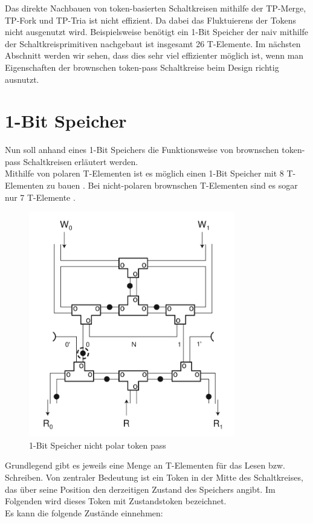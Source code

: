 \documentclass[11pt,a4paper]{article}
\begin{document}
%
Das direkte Nachbauen von token-basierten Schaltkreisen mithilfe
der TP-Merge, TP-Fork und TP-Tria ist nicht effizient.
%
Da dabei das Fluktuierens der Tokens nicht ausgenutzt wird.
%
Beispielsweise benötigt ein 1-Bit Speicher der naiv mithilfe der 
Schaltkreisprimitiven nachgebaut ist insgesamt 26 T-Elemente.
%
Im nächsten Abschnitt werden wir sehen, dass dies sehr viel effizienter möglich
ist, wenn man Eigenschaften der brownschen token-pass Schaltkreise
beim Design richtig ausnutzt.



\section{1-Bit Speicher}
Nun soll anhand eines 1-Bit Speichers die Funktionsweise von brownschen 
token-pass Schaltkreisen erläutert werden.
%
\\ Mithilfe von polaren T-Elementen ist es möglich einen 1-Bit Speicher mit 8
T-Elementen zu bauen \cite{Peper_Fundamentals_2013}. 
%
Bei nicht-polaren brownschen T-Elementen sind es sogar
nur 7  T-Elemente \cite{Peper_nonPolar_2018}.

\begin{figure}[h]
      \centering
      \includegraphics[width=9cm]{bilder/NonPolarMemory.png} 
      \caption{1-Bit Speicher nicht polar token pass}
\end{figure}

Grundlegend gibt es jeweils eine Menge an T-Elementen für das Lesen bzw. 
Schreiben.
%
Von zentraler Bedeutung ist ein Token in der Mitte des Schaltkreises,
das über seine Position den derzeitigen Zustand des Speichers angibt.
%
Im Folgenden wird dieses Token mit Zustandstoken bezeichnet. \\
%
Es kann die folgende Zustände einnehmen:
\end{document}
